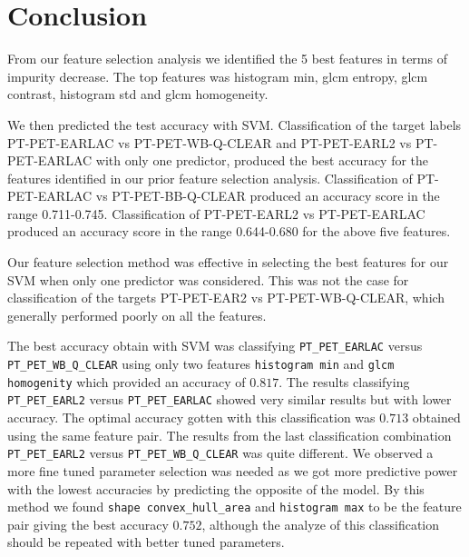 \section{Conclusion}

From our feature selection analysis we identified the 5 best features in terms
of impurity decrease. The top features was histogram min, glcm entropy, glcm
contrast, histogram std and glcm homogeneity. 

We then predicted the test accuracy with SVM. Classification of the target
labels PT-PET-EARLAC vs PT-PET-WB-Q-CLEAR and PT-PET-EARL2 vs PT-PET-EARLAC
with only one predictor, produced the best accuracy for the features identified
in our prior feature selection analysis. 
Classification of PT-PET-EARLAC vs PT-PET-BB-Q-CLEAR produced an accuracy score
in the range 0.711-0.745. 
Classification of PT-PET-EARL2 vs PT-PET-EARLAC produced an accuracy score in
the range 0.644-0.680 for the above five features. 

Our feature selection method was
effective in selecting the best features for our SVM when only one predictor
was considered. 
This was not the case for classification of the targets PT-PET-EAR2 vs
PT-PET-WB-Q-CLEAR, which generally performed poorly on all the features. 





The best accuracy obtain with SVM was classifying \verb|PT_PET_EARLAC| versus \verb|PT_PET_WB_Q_CLEAR|
using only two features \verb|histogram min| and \verb|glcm homogenity| which provided 
an accuracy of $0.817$. The results classifying \verb|PT_PET_EARL2| versus \verb|PT_PET_EARLAC| showed 
very similar results but with lower accuracy. The optimal accuracy gotten with this classification was 
$0.713$ obtained using the same feature pair. The results from the last classification combination
 \verb|PT_PET_EARL2| versus \verb|PT_PET_WB_Q_CLEAR| was quite different. We observed a more fine tuned 
 parameter selection was needed as we got more predictive power with the lowest accuracies by predicting the 
 opposite of the model. By this method we found \verb|shape convex_hull_area| and \verb|histogram max| 
 to be the feature pair giving the best accuracy $0.752$, although the analyze of this classification 
 should be repeated with better tuned parameters. 


